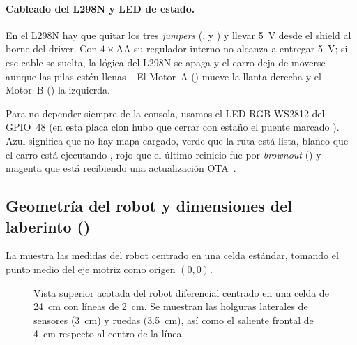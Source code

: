 \paragraph{Cableado del L298N y LED de estado.}
En el L298N hay que quitar los tres \emph{jumpers} (,  y ) y llevar \SI{5}{\volt} desde el shield al borne  del driver. Con $4\times\text{AA}$ su regulador interno no alcanza a entregar \SI{5}{\volt}; si ese cable se suelta, la lógica del L298N se apaga y el carro deja de moverse aunque las pilas estén llenas~\cite{handoff2026doc}. El Motor~A () mueve la llanta derecha y el Motor~B () la izquierda.

Para no depender siempre de la consola, usamos el LED RGB WS2812 del GPIO~48 (en esta placa clon hubo que cerrar con estaño el puente marcado ). Azul significa que no hay mapa cargado, verde que la ruta está lista, blanco que el carro está ejecutando , rojo que el último reinicio fue por \emph{brownout} () y magenta que está recibiendo una actualización OTA~\cite{repo2026agentelaberinto}.

\subsection{Geometría del robot y dimensiones del laberinto ()}
\label{subsec:geometria}

La  muestra las medidas del robot centrado en una celda estándar, tomando el punto medio del eje motriz como origen $(0,0)$.

\begin{figure}[H]
  \centering
  
  \caption{Vista superior acotada del robot diferencial centrado en una celda de \SI{24}{\centi\meter} con líneas de \SI{2}{\centi\meter}. Se muestran las holguras laterales de sensores (\SI{3}{\centi\meter}) y ruedas (\SI{3.5}{\centi\meter}), así como el saliente frontal de \SI{4}{\centi\meter} respecto al centro de la línea.}
  \label{fig:geometria-carro}
\end{figure}


